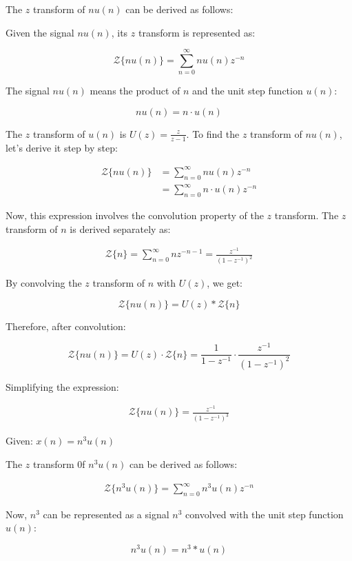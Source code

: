 \documentclass{article}
\begin{document}
The $z$ transform of $nu(n)$ can be derived as follows:

Given the signal $nu(n)$, its $z$ transform is represented as:

\[
\mathcal{Z}\{nu(n)\} = \sum_{n=0}^{\infty} nu(n)z^{-n}
\]

The signal $nu(n)$ means the product of $n$ and the unit step function $u(n)$:

\[
nu(n) = n \cdot u(n)
\]

The $z$ transform of $u(n)$ is $U(z) = \frac{z}{z-1}$. To find the $z$ transform of $nu(n)$, let's derive it step by step:

\begin{align*}
\mathcal{Z}\{nu(n)\} &= \sum_{n=0}^{\infty} nu(n)z^{-n} \\
&= \sum_{n=0}^{\infty} n \cdot u(n)z^{-n}
\end{align*}

Now, this expression involves the convolution property of the $z$ transform. The $z$ transform of $n$ is derived separately as:

\begin{align}
\mathcal{Z}\{n\} = \sum_{n=0}^{\infty} nz^{-n-1} = \frac{z^{-1}}{(1-z^{-1})^2}
\end{align}

By convolving the $z$ transform of $n$ with $U(z)$, we get:

\[
\mathcal{Z}\{nu(n)\} = U(z) * \mathcal{Z}\{n\}
\]

Therefore, after convolution:

\[
\mathcal{Z}\{nu(n)\} = U(z) \cdot \mathcal{Z}\{n\} = \frac{1}{1-z^{-1}} \cdot \frac{z^{-1}}{(1-z^{-1})^2}
\]

Simplifying the expression:

\begin{align}
\mathcal{Z}\{nu(n)\} = \frac{z^{-1}}{(1-z^{-1})^3}
\end{align}


Given: $x(n) = n^3u(n)$

The $z$ transform 0f $n^3u(n)$ can be derived as follows:

\begin{align}
\mathcal{Z}\{n^3u(n)\} = \sum_{n=0}^{\infty} n^3u(n)z^{-n} \end{align}

Now, $n^3$ can be represented as a signal $n^3$ convolved with the unit step function $u(n)$:

\[
 n^3u(n) = n^3 * u(n) 
 \]
\end{document}
